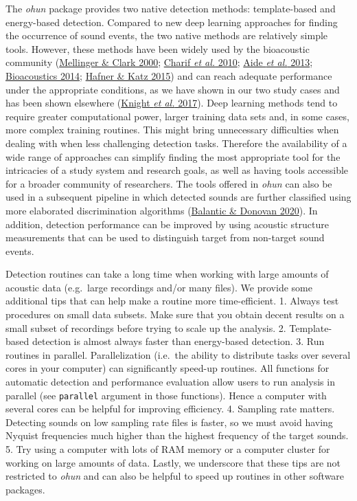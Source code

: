 \documentclass[
]{article}
\begin{document}
The \emph{ohun} package provides two native detection methods:
template-based and energy-based detection. Compared to new deep learning
approaches for finding the occurrence of sound events, the two native
methods are relatively simple tools. However, these methods have been
widely used by the bioacoustic community
(\protect\hyperlink{ref-mellinger2000}{Mellinger \& Clark 2000};
\protect\hyperlink{ref-Charif2010}{Charif \emph{et al.} 2010};
\protect\hyperlink{ref-aide2013}{Aide \emph{et al.} 2013};
\protect\hyperlink{ref-avi2014}{Bioacoustics 2014};
\protect\hyperlink{ref-Hafner2015}{Hafner \& Katz 2015}) and can reach
adequate performance under the appropriate conditions, as we have shown
in our two study cases and has been shown elsewhere
(\protect\hyperlink{ref-knight2017}{Knight \emph{et al.} 2017}). Deep
learning methods tend to require greater computational power, larger
training data sets and, in some cases, more complex training routines.
This might bring unnecessary difficulties when dealing with when less
challenging detection tasks. Therefore the availability of a wide range
of approaches can simplify finding the most appropriate tool for the
intricacies of a study system and research goals, as well as having
tools accessible for a broader community of researchers. The tools
offered in \emph{ohun} can also be used in a subsequent pipeline in
which detected sounds are further classified using more elaborated
discrimination algorithms (\protect\hyperlink{ref-balantic2020}{Balantic
\& Donovan 2020}). In addition, detection performance can be improved by
using acoustic structure measurements that can be used to distinguish
target from non-target sound events.

Detection routines can take a long time when working with large amounts
of acoustic data (e.g.~large recordings and/or many files). We provide
some additional tips that can help make a routine more time-efficient.
1. Always test procedures on small data subsets. Make sure that you
obtain decent results on a small subset of recordings before trying to
scale up the analysis. 2. Template-based detection is almost always
faster than energy-based detection. 3. Run routines in parallel.
Parallelization (i.e.~the ability to distribute tasks over several cores
in your computer) can significantly speed-up routines. All functions for
automatic detection and performance evaluation allow users to run
analysis in parallel (see \texttt{parallel} argument in those
functions). Hence a computer with several cores can be helpful for
improving efficiency. 4. Sampling rate matters. Detecting sounds on low
sampling rate files is faster, so we must avoid having Nyquist
frequencies much higher than the highest frequency of the target sounds.
5. Try using a computer with lots of RAM memory or a computer cluster
for working on large amounts of data. Lastly, we underscore that these
tips are not restricted to \emph{ohun} and can also be helpful to speed
up routines in other software packages.
\end{document}
